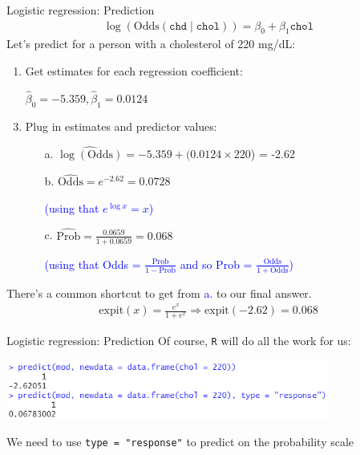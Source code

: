 \documentclass[10pt,t]{beamer}
\begin{document}
\begin{frame}{Logistic regression: Prediction}
	\vspace{-1cm}
		\begin{align*}
		\log(\text{Odds}(\texttt{chd} \mid \texttt{chol})) = \beta_0 + \beta_1 \texttt{chol}
	\end{align*}
	Let's predict for a person with a cholesterol of 220 mg/dL:
	\begin{enumerate}
		\item Get estimates for each regression coefficient: 
		\item[] $\hat{\beta}_0 = -5.359, \hat{\beta}_1 = 0.0124$
		\item Plug in estimates and predictor values:
		\begin{enumerate}
			\item[a.] $\widehat{\log(\text{Odds})} = -5.359 + (0.0124\times220$) = -2.62
			\item[b.] $\widehat{\text{Odds}} = e^{-2.62} = 0.0728$
			\item[] \textcolor{blue}{(using that $e^{\log x} = x$)}
			\item[c.] $\widehat{\text{Prob}} = \frac{0.0659}{1 + 0.0659} = 0.068$
			\item[] \textcolor{blue}{(using that Odds = $\frac{\text{Prob}}{1-\text{Prob}}$ and so Prob = $\frac{\text{Odds}}{1  +\text{Odds}}$)}
		\end{enumerate}
	\end{enumerate}
	There's a common shortcut to get from \textcolor{blue}{a.} to our final answer. 
	\begin{align*}
		\text{expit}(x) = \frac{e^x}{1 + e^x} \Rightarrow \text{expit}(-2.62) = 0.068
	\end{align*}
\end{frame}

\begin{frame}{Logistic regression: Prediction}
	Of course, \texttt{R} will do all the work for us: 
	\begin{center}
		\includegraphics[width=0.8\textwidth]{./figs/simple_logistic_regression_chol_prediction}
	\end{center}
	We need to use \texttt{type = "response"} to predict on the probability scale
\end{frame}
\end{document}

